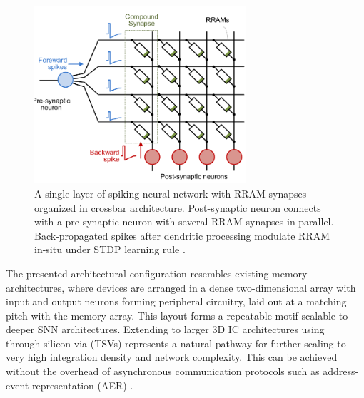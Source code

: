 \begin{figure}[htbp!] 
    \centering    
    \includegraphics[width=0.7\textwidth]{Chapter6/Figs/e.png}
    \caption[A single layer of spiking neural network with RRAM synapses organized in crossbar architecture.]{A single layer of spiking neural network with RRAM synapses organized in crossbar architecture. Post-synaptic neuron connects with a pre-synaptic neuron with several RRAM synapses in parallel. Back-propagated spikes after dendritic processing modulate RRAM in-situ under STDP learning rule \cite{wu2018dendritic}.}
    \label{fig:6e}
\end{figure}



\noindent The presented architectural configuration resembles existing memory architectures, where devices are arranged in a dense two-dimensional array with input and output neurons forming peripheral circuitry, laid out at a matching pitch with the memory array. This layout forms a repeatable motif scalable to deeper SNN architectures. Extending to larger 3D IC architectures using through-silicon-via (TSVs) represents a natural pathway for further scaling to very high integration density and network complexity. This can be achieved without the overhead of asynchronous communication protocols such as address-event-representation (AER) \cite{jo2009programmable}.\\

